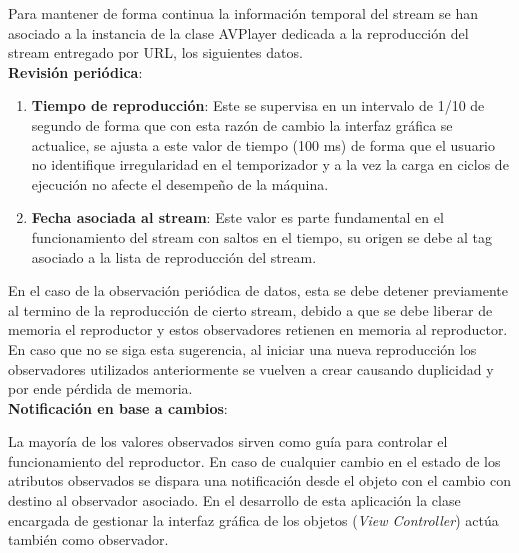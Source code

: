 Para mantener de forma continua la información temporal del stream se han asociado a la instancia de la clase AVPlayer dedicada a la reproducción del stream entregado por URL, los siguientes datos.\\

\textbf{Revisión periódica}:

\begin{enumerate}
\item \textbf{Tiempo de reproducción}: Este se supervisa en un intervalo de 1/10 de segundo de forma que con esta razón de cambio la interfaz gráfica se actualice, se ajusta a  este valor de tiempo (100 ms) de forma que el usuario no identifique irregularidad en el temporizador y a la vez la carga en ciclos de ejecución no afecte el desempeño de la máquina.
\item \textbf{Fecha asociada al stream}: Este valor es parte fundamental en el funcionamiento del stream con saltos en el tiempo, su origen se debe al tag asociado a la lista de reproducción del stream.
\label{observer-date}

\end{enumerate}

En el caso de la observación periódica de datos, esta se debe detener previamente al termino de la reproducción de cierto stream, debido a que se debe liberar de memoria el reproductor y estos observadores retienen en memoria al reproductor. En caso que no se siga esta sugerencia, al iniciar una nueva reproducción los observadores utilizados anteriormente se vuelven a crear causando duplicidad y por ende pérdida de memoria.\\


\textbf{Notificación en base a cambios}:

La mayoría de los valores observados sirven como guía para controlar el funcionamiento del reproductor. En caso de cualquier cambio en el estado de los atributos observados se dispara una notificación desde el objeto con el cambio con destino al observador asociado. 
En el desarrollo de esta aplicación la clase encargada de gestionar la interfaz gráfica de los objetos (\textit{View Controller}) actúa también como observador.\\

